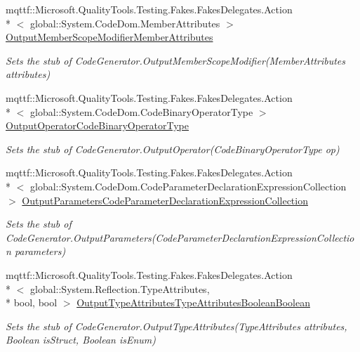 \begin{DoxyCompactItemize}
mqttf\-::\-Microsoft.\-Quality\-Tools.\-Testing.\-Fakes.\-Fakes\-Delegates.\-Action\\*
$<$ global\-::\-System.\-Code\-Dom.\-Member\-Attributes $>$ \hyperlink{class_system_1_1_code_dom_1_1_compiler_1_1_fakes_1_1_stub_code_generator_a7291374c476b7c24fc8216f6660ab3d9}{Output\-Member\-Scope\-Modifier\-Member\-Attributes}
\begin{DoxyCompactList}\small\item\em Sets the stub of Code\-Generator.\-Output\-Member\-Scope\-Modifier(\-Member\-Attributes attributes)\end{DoxyCompactList}\item 
mqttf\-::\-Microsoft.\-Quality\-Tools.\-Testing.\-Fakes.\-Fakes\-Delegates.\-Action\\*
$<$ global\-::\-System.\-Code\-Dom.\-Code\-Binary\-Operator\-Type $>$ \hyperlink{class_system_1_1_code_dom_1_1_compiler_1_1_fakes_1_1_stub_code_generator_a437ba7d5ecbefd30bda96f9fcb9f55c7}{Output\-Operator\-Code\-Binary\-Operator\-Type}
\begin{DoxyCompactList}\small\item\em Sets the stub of Code\-Generator.\-Output\-Operator(\-Code\-Binary\-Operator\-Type op)\end{DoxyCompactList}\item 
mqttf\-::\-Microsoft.\-Quality\-Tools.\-Testing.\-Fakes.\-Fakes\-Delegates.\-Action\\*
$<$ global\-::\-System.\-Code\-Dom.\-Code\-Parameter\-Declaration\-Expression\-Collection $>$ \hyperlink{class_system_1_1_code_dom_1_1_compiler_1_1_fakes_1_1_stub_code_generator_a81bf5a6f5dc90adf5489ee82a472e11f}{Output\-Parameters\-Code\-Parameter\-Declaration\-Expression\-Collection}
\begin{DoxyCompactList}\small\item\em Sets the stub of Code\-Generator.\-Output\-Parameters(\-Code\-Parameter\-Declaration\-Expression\-Collection parameters)\end{DoxyCompactList}\item 
mqttf\-::\-Microsoft.\-Quality\-Tools.\-Testing.\-Fakes.\-Fakes\-Delegates.\-Action\\*
$<$ global\-::\-System.\-Reflection.\-Type\-Attributes, \\*
bool, bool $>$ \hyperlink{class_system_1_1_code_dom_1_1_compiler_1_1_fakes_1_1_stub_code_generator_a34822ed95c4cf81aeab7f7c86e59e8fc}{Output\-Type\-Attributes\-Type\-Attributes\-Boolean\-Boolean}
\begin{DoxyCompactList}\small\item\em Sets the stub of Code\-Generator.\-Output\-Type\-Attributes(\-Type\-Attributes attributes, Boolean is\-Struct, Boolean is\-Enum)\end{DoxyCompactList}\item 

\end{DoxyCompactItemize}
